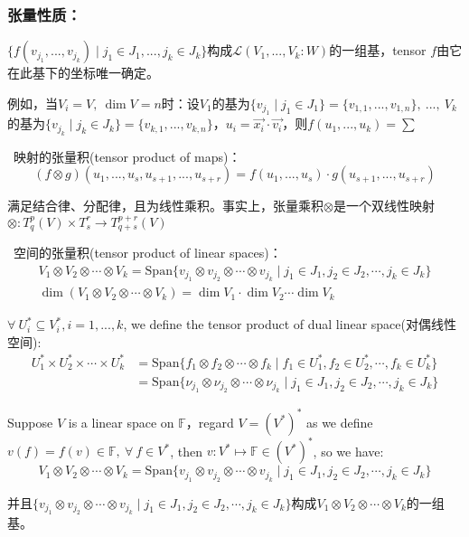 \documentclass[zihao=5,UTF8]{report}
\def\F{\mathbb{F}}
\theoremstyle{mystyle} %
\begin{document}
\subsubsection{张量性质：}
\par{} $\{f(v_{j_1},...,v_{j_k})\mid j_1 \in J_1,...,j_k \in J_k\}$构成$\mathscr{L}(V_1,...,V_k:W)$的一组基，tensor
 $f$由它在此基下的坐标唯一确定。 \par
{\par\color{gray}\small
例如，当$V_i=V,\ \dim V=n$时：设$V_1$的基为$\{v_{j_1}\mid j_1 \in J_1\}=\{v_{1,1},...,v_{1,n} \},\ ...,\ V_k$的基为$\{v_{j_k}\mid j_k \in J_k\}=\{v_{k,1},...,v_{k,n} \}$，$u_i=\vec{x_i}\cdot\vec{v_i}$，则$f(u_1,...,u_k)=\sum $
\par}

\  映射的张量积(tensor product of maps)：
\begin{equation*}
    (f \otimes g)(u_1,...,u_s,u_{s+1},...,u_{s+r}) = f(u_1,...,u_s)\cdot g(u_{s+1},...,u_{s+r})
\end{equation*}
{\par\color{gray}\small
满足结合律、分配律，且为线性乘积。事实上，张量乘积$\otimes$是一个双线性映射$\otimes: T^p_q(V)\times T^r_s \longrightarrow T^{p+r}_{q+s}(V)$\par}
\par
{}\ 空间的张量积(tensor product of linear spaces)： 
\begin{gather*}
    V_1 \otimes V_2 \otimes \cdots \otimes V_k = \text{Span}\{v_{j_1} \otimes v_{j_2} \otimes\cdots \otimes v_{j_k}\mid j_1\in J_1,j_2\in J_2,\cdots,j_k\in J_k\}\\ 
    \dim (V_1 \otimes V_2 \otimes \cdots \otimes V_k) = \dim V_1 \cdot \dim V_2 \cdots  \dim V_k
\end{gather*}
\par

{\par\color{gray}\small
$\forall\  U^*_i \subseteq V^*_i, i=1,...,k$, we define the tensor product of dual linear space(对偶线性空间): 
\begin{align*}
    U^*_1\times U^*_2\times \cdots \times U^*_k &= \text{Span}\{f_1 \otimes f_2 \otimes \cdots \otimes f_k \mid f_1 \in U^*_1, f_2 \in U^*_2, \cdots, f_k \in U^*_k\}\\
    &=\text{Span}\{\nu_{j_1} \otimes\nu_{j_2} \otimes\cdots \otimes\nu_{j_k}\mid j_1\in J_1,j_2\in J_2,\cdots,j_k\in J_k\}
\end{align*}

Suppose $V$ is a linear space on $\F$，regard $V = (V^*)^*$ as we define $v(f) = f(v) \in \F,\ \forall\ f \in V^*$, then $v: V^* \longmapsto \F \in (V^*)^*$, so we have:
\begin{equation*}
    V_1 \otimes V_2 \otimes \cdots \otimes V_k = \text{Span}\{v_{j_1} \otimes v_{j_2} \otimes\cdots \otimes v_{j_k}\mid j_1\in J_1,j_2\in J_2,\cdots,j_k\in J_k\}
\end{equation*}

并且$\{v_{j_1} \otimes v_{j_2} \otimes\cdots \otimes v_{j_k}\mid j_1\in J_1,j_2\in J_2,\cdots,j_k\in J_k\}$构成$V_1 \otimes V_2 \otimes \cdots \otimes V_k$的一组基。
\par}
\end{document}
